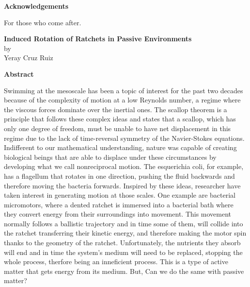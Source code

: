\newpage %
\Huge {\bf Acknowledgements} \\
\normalsize

For those who come after.

\vspace{5em}

\newpage %
\begin{center}
  \large {{\bf Induced Rotation of Ratchets in Passive Environments}\\
  by\\
Yeray Cruz Ruiz}
\end{center}
\Huge{{\bf Abstract}} \\
\normalsize
\vspace*{0em}

Swimming at the mesoscale has been a topic of interest for the past two decades because of the complexity of motion at a low Reynolds number, a regime where the viscous forces dominate over the inertial ones. The scallop theorem is a principle that follows these complex ideas and states that a scallop, which has only one degree of freedom, must be unable to have net displacement in this regime due to the lack of time-reversal symmetry of the Navier-Stokes equations. Indifferent to our mathematical understanding, nature was capable of creating biological beings that are able to displace under these circumstances by developing what we call nonreciprocal motion. The esquerichia coli, for example, has a flagellum that rotates in one direction, pushing the fluid backwards and therefore moving the bacteria forwards. Inspired by these ideas, researcher have taken interest in generating motion at those scales. One example are bacterial micromotors, where a dented ratchet is immersed into a bacterial bath where they convert energy from their surroundings into movement. This movement normally follows a ballistic trajectory and in time some of them, will collide into the ratchet transferring their kinetic energy, and therefore making the motor spin thanks to the geometry of the ratchet. Unfortunately, the nutrients they absorb will end and in time the system's medium will need to be replaced, stopping the whole process, therfore being an inneficient process. This is a type of active matter that gets energy from its medium. But, Can we do the same with passive matter?

